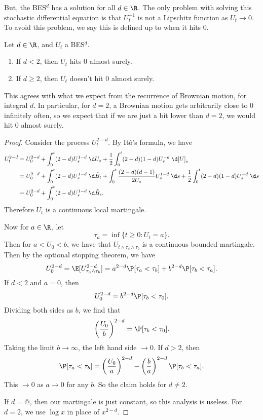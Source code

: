 \documentclass[a4paper]{article}
\begin{document}
But, the BES$^d$ has a solution for all $d \in \R$. The only problem with solving this stochastic differential equation is that $U_t^{-1}$ is not a Lipschitz function as $U_t \to 0$. To avoid this problem, we say this is defined up to when it hits $0$.

\begin{prop}
  Let $d \in \R$, and $U_t$ a BES$^d$.
  \begin{enumerate}
    \item If $d < 2$, then $U_t$ hits $0$ almost surely.
    \item If $d \geq 2$, then $U_t$ doesn't hit $0$ almost surely.
  \end{enumerate}
\end{prop}
This agrees with what we expect from the recurrence of Brownian motion, for integral $d$. In particular, for $d = 2$, a Brownian motion gets arbitrarily close to $0$ infinitely often, so we expect that if we are just a bit lower than $d = 2$, we would hit $0$ almost surely.
\begin{proof}
  Consider the process $U_t^{2 - d}$. By It\^o's formula, we have
  \begin{align*}
    U_t^{2 - d} &= U_0^{2 - d} + \int_0^t (2 - d) U_s^{1 - d} \;\d U_s + \frac{1}{2} \int_0^t (2 - d) (1 - d) U_s^{-d} \;\d [U]_s\\
    &= U_0^{2 - d} + \int_0^t (2 - d) U_s^{1 - d} \;\d \tilde{B}_t + \int_0^t \frac{(2 - d)(d - 1)}{2 U_s} U_s^{1 - d}\;\d s + \frac{1}{2} \int_0^t (2 - d)(1 - d) U_s^{-d}\;\d s\\
    &= U_0^{2 - d} + \int_0^t (2 - d) U_s^{1 - d}\;\d \tilde{B}_s.
  \end{align*}
  Therefore $U_t$ is a continuous local martingale.

  Now for $a \in \R$, let
  \[
    \tau_a = \inf \{t \geq 0 : U_t = a\}.
  \]
  Then for $a < U_0 < b$, we have that $U_{t \wedge \tau_a \wedge \tau_b}$ is a continuous bounded martingale. Then by the optional stopping theorem, we have
  \[
    U_0^{2 - d} = \E [U_{\tau_a \wedge \tau_b}^{2 - d}] = a^{2 - d} \P[\tau_a < \tau_b] + b^{2 - d} \P[\tau_b < \tau_a].
  \]
  If $d < 2$ and $a = 0$, then
  \[
    U_0^{2 - d} = b^{2 - d} \P[\tau_b < \tau_0].
  \]
  Dividing both sides as $b$, we find that
  \[
    \left(\frac{U_0}{b}\right)^{2 -d } = \P[\tau_b < \tau_0].
  \]
  Taking the limit $b \to \infty$, the left hand side $\to 0$. If $d > 2$, then
  \[
    \P[\tau_a < \tau_b] = \left(\frac{U_0}{a}\right)^{2 - d} - \left(\frac{b}{a}\right)^{2 - d} \P[\tau_b < \tau_a].
  \]
  This $\to 0$ as $a \to 0$ for any $b$. So the claim holds for $d \not= 2$.

  If $d = @$, then our martingale is just constant, so this analysis is useless. For $d = 2$, we use $\log x$ in place of $x^{2 - d}$.
\end{proof}
\end{document}
